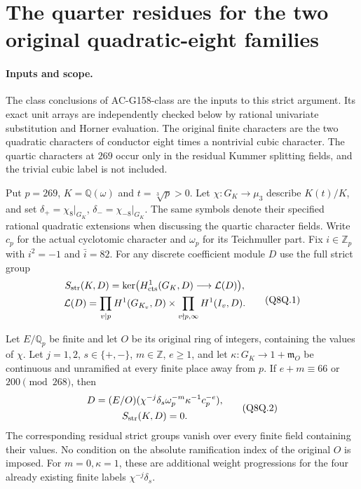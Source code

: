 \section{The quarter residues for the two original quadratic-eight families}
\label{sec:quadratic8-quartic-residue-strict}

\paragraph{Inputs and scope.}
The class conclusions of AC-G158-class are the inputs to this
strict argument.  Its exact unit arrays are independently checked
below by rational univariate substitution and Horner evaluation.
The original finite characters are the two quadratic characters
of conductor eight times a nontrivial cubic character.
The quartic characters at $269$ occur only in the residual
Kummer splitting fields, and the trivial cubic label is not included.

Put $p=269$, $K=\mathbb Q(\omega)$ and $t=\sqrt[3]p>0$.
Let $\chi:G_K\to\mu_3$ describe $K(t)/K$, and set
$\delta_+=\chi_8|_{G_K}$, $\delta_-=\chi_{-8}|_{G_K}$.
The same symbols denote their specified rational quadratic
extensions when discussing the quartic character fields.
Write $c_p$ for the actual cyclotomic character and $\omega_p$
for its Teichmuller part.  Fix $i\in\mathbb Z_p$ with
$i^2=-1$ and $\bar i=82$.
For any discrete coefficient module $D$ use the full strict group
\[
 \begin{gathered}
 S_{\rm str}(K,D)=\ker\bigl(H^1_{\rm cts}(G_K,D)
                                  \longrightarrow\mathcal L(D)\bigr),\\
 \mathcal L(D)=\prod_{v\mid p}H^1(G_{K_v},D)
              \times\prod_{v\nmid p,\infty}H^1(I_v,D).
 \end{gathered}
 \tag{Q8Q.1}
\]

\begin{theorem}
\label{AC-G158}
Let $E/\mathbb Q_p$ be finite and let $O$ be its original ring
of integers, containing the values of $\chi$.
Let $j=1,2$, $s\in\{+,-\}$, $m\in\mathbb Z$, $e\geq1$, and let
$\kappa:G_K\to1+\mathfrak m_O$ be continuous and unramified
at every finite place away from $p$.
If $e+m\equiv66$ or $200\pmod{268}$, then
\[
 \begin{gathered}
 D=(E/O)(\chi^{-j}\delta_s\omega_p^{-m}\kappa^{-1}c_p^{-e}),\\
                          S_{\rm str}(K,D)=0.
 \end{gathered}
 \tag{Q8Q.2}
\]
The corresponding residual strict groups vanish over every finite
field containing their values.  No condition on the absolute
ramification index of the original $O$ is imposed.
For $m=0,\kappa=1$, these are additional weight progressions
for the four already existing finite labels $\chi^{-j}\delta_s$.
\end{theorem}

